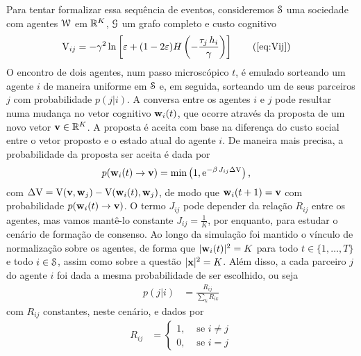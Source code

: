 Para tentar formalizar essa sequência de eventos, consideremos $\mathcal{S}$ uma sociedade com agentes $\mathcal{W}$ em $\mathbb{R}^K$, $\mathcal{G}$ um grafo completo e custo cognitivo
\begin{align}
\cogcost_{ij} & =-\gm^2\ln\inbk{\ns+(1-2\ns)H\inpr{-\frac{\tau_j\,h_i}{\gm}}} \tag{\ref{eq:Vij}}
\end{align}
O encontro de dois agentes, num passo microscópico $t$, é emulado sorteando um agente $i$ de maneira uniforme em $\mathcal{S}$ e, em seguida, sorteando um de seus parceiros $j$ com probabilidade $p(j|i)$.
A conversa entre os agentes $i$  e $j$ pode resultar numa mudança no vetor cognitivo $\mathbf{w}_{i}(t)$, que ocorre através da proposta de um novo vetor $\mathbf{v} \in \mathbb{R}^K$.
A proposta é aceita com base na diferença do custo social entre o vetor proposto e o estado atual do agente $i$.
De maneira mais precisa, a probabilidade da proposta ser aceita é dada por
\begin{align}
  p(\agt{i}(t)\to\vec{v}) & =\min\inpr{1, \EulerE^{-\beta\,J_{ij}\Delta \cogcost}}\text{,} \label{eq:Pacc}
\end{align}
com $\Delta {\mathrm{V}} = {\mathrm{V}}(\mathbf{v},\mathbf{w}_{j}) - {\mathrm{V}}(\mathbf{w}_{i}(t),\mathbf{w}_{j})$, de modo que $\mathbf{w}_{i}(t+1) = \mathbf{v}$ com probabilidade $p(\mathbf{w}_{i}(t)\to\mathbf{v})$.
O termo $J_{ij}$ pode depender da relação $R_{ij}$ entre os agentes, mas vamos mantê-lo constante $J_{ij}=\frac{1}{K}$, por enquanto, para estudar o cenário de formação de consenso.
Ao longo da simulação foi mantido o vínculo de normalização sobre os agentes, de forma que $|\mathbf{w}_{i}(t)|^2=K$ para todo $t \in \{1,\dots,T\}$ e todo $i \in \mathcal{S}$, assim como sobre a questão $|\mathbf{x}|^2=K$.
Além disso, a cada parceiro $j$ do agente $i$ foi dada a mesma probabilidade de ser escolhido, ou seja
\begin{align}
p(j|i) & = \frac{R_{ij}}{\sum_{k}R_{ik}} \label{eq:P(j|i)}
\end{align}
com $R_{ij}$ constantes, neste cenário, e dados por
\begin{align}
R_{ij} & = \begin{cases}
  1, & \text{ se } i \neq j \\
  0, & \text{ se } i = j
\end{cases} \label{eq:Rij-consensus}
\end{align}

